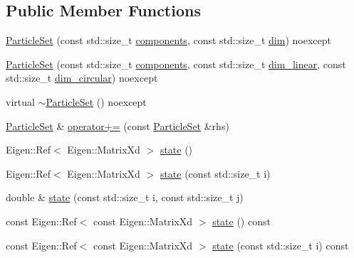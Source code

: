 \subsection*{Public Member Functions}
\begin{DoxyCompactItemize}
\item 
\mbox{\hyperlink{classbfl_1_1ParticleSet_a129747cd8ae551459f3c84e3da6cc537}{Particle\+Set}} (const std\+::size\+\_\+t \mbox{\hyperlink{classbfl_1_1GaussianMixture_a02cc284327dbaa6b90c653dd2faccf88}{components}}, const std\+::size\+\_\+t \mbox{\hyperlink{classbfl_1_1GaussianMixture_a3f2b18801e72fa3bf0d6edc778662a8d}{dim}}) noexcept
\item 
\mbox{\hyperlink{classbfl_1_1ParticleSet_ac8f2c09290542de9732438a77a2afc3a}{Particle\+Set}} (const std\+::size\+\_\+t \mbox{\hyperlink{classbfl_1_1GaussianMixture_a02cc284327dbaa6b90c653dd2faccf88}{components}}, const std\+::size\+\_\+t \mbox{\hyperlink{classbfl_1_1GaussianMixture_a22a0fbc77f90d9d75e89d7898484c05a}{dim\+\_\+linear}}, const std\+::size\+\_\+t \mbox{\hyperlink{classbfl_1_1GaussianMixture_a23f3b92753266475a9bff8ee7e1c9518}{dim\+\_\+circular}}) noexcept
\item 
virtual \mbox{\hyperlink{classbfl_1_1ParticleSet_aa49ff9b36c641e3bc5dce28b0ae83180}{$\sim$\+Particle\+Set}} () noexcept
\item 
\mbox{\hyperlink{classbfl_1_1ParticleSet}{Particle\+Set}} \& \mbox{\hyperlink{classbfl_1_1ParticleSet_a79153d8980f985a33ddf9b4abd40f8ed}{operator+=}} (const \mbox{\hyperlink{classbfl_1_1ParticleSet}{Particle\+Set}} \&rhs)
\item 
Eigen\+::\+Ref$<$ Eigen\+::\+Matrix\+Xd $>$ \mbox{\hyperlink{classbfl_1_1ParticleSet_a85950583083c2903f4235801cc03130c}{state}} ()
\item 
Eigen\+::\+Ref$<$ Eigen\+::\+Matrix\+Xd $>$ \mbox{\hyperlink{classbfl_1_1ParticleSet_abac71061f890d8356bd83e69a07fd86b}{state}} (const std\+::size\+\_\+t i)
\item 
double \& \mbox{\hyperlink{classbfl_1_1ParticleSet_a363c8f374c6708b347233ed70c3f678f}{state}} (const std\+::size\+\_\+t i, const std\+::size\+\_\+t j)
\item 
const Eigen\+::\+Ref$<$ const Eigen\+::\+Matrix\+Xd $>$ \mbox{\hyperlink{classbfl_1_1ParticleSet_a8f42ac3164fd761e75408c7f1a128b77}{state}} () const
\item 
const Eigen\+::\+Ref$<$ const Eigen\+::\+Matrix\+Xd $>$ \mbox{\hyperlink{classbfl_1_1ParticleSet_a8867cf0347f12e0a4368d8daea832df9}{state}} (const std\+::size\+\_\+t i) const
\item 

\end{DoxyCompactItemize}
